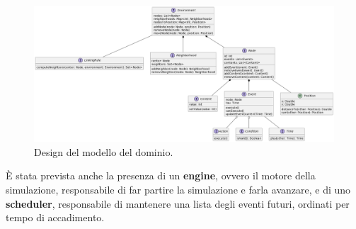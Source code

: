 \documentclass[12pt,a4paper,openright,twoside]{book}
\begin{document}
\begin{figure}
    \centering
    \includegraphics[width=\linewidth]{figures/design/class-diagram.png}
    \caption{Design del modello del dominio.}
    \label{fig:design-class-diagram}
\end{figure}

È stata prevista anche la presenza di un \textbf{engine}, ovvero il motore della simulazione, responsabile di far partire la simulazione e farla avanzare, e di uno \textbf{scheduler}, responsabile di mantenere una lista degli eventi futuri, ordinati per tempo di accadimento. 
\end{document}
